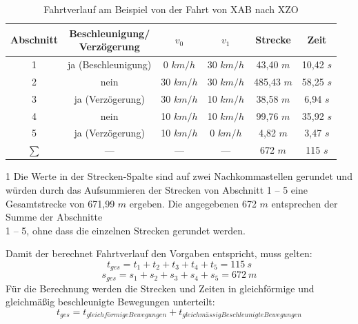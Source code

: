\begin{table}
\begin{center}
\begin{threeparttable}
\renewcommand{\arraystretch}{1.2}
\begin{tabular}{c|c|c|c|c|c}
Abschnitt & \makecell{Beschleunigung/\\Verzögerung}& $v_0$ & $v_1$ & Strecke & Zeit\\ \hline
1                   &   ja (Beschleunigung)   & 0 $km/h$ & 30 $km/h$        &         43,40 $m$    & 10,42 $s$   \\ \hline
2                  &       nein& 30 $km/h$ & 30 $km/h$       &    485,43 $m$ & 58,25 $s$   \\ \hline
3                   &       ja (Verzögerung)& 30 $km/h$ & 10 $km/h$           &   38,58 $m$    & 6,94 $s$  \\ \hline
4                   &      nein & 10 $km/h$ & 10 $km/h$       &   99,76 $m$    & 35,92 $s$   \\ \hline
5                   &       ja (Verzögerung)& 10 $km/h$ & 0 $km/h$          &    4,82 $m$  & 3,47 $s$ \\ \hline
$\sum$                   &       ---& --- & ---          &    672 $m$\tnote{1}  & 115 $s$ \\ 
\end{tabular}
\begin{tablenotes}\footnotesize
    \item[1] Die Werte in der Strecken-Spalte sind auf zwei Nachkommastellen gerundet und würden durch das Aufsummieren der Strecken von Abschnitt 1 -- 5 eine Gesamtstrecke von 671,99 $m$ ergeben. Die angegebenen 672 $m$ entsprechen der Summe der Abschnitte\\1 -- 5, ohne dass die einzelnen Strecken gerundet werden.
\end{tablenotes}
\renewcommand{\arraystretch}{1}
\caption{Fahrtverlauf am Beispiel von der Fahrt von XAB nach XZO}
\label{table:beispielebuef}
\end{threeparttable}
\end{center}
\end{table}
\noindent Damit der berechnet Fahrtverlauf den Vorgaben entspricht, muss gelten:
\[t_{ges} = t_1 + t_2 + t_3 + t_4 + t_5 = 115\:s\]
\[s_{ges} = s_1 + s_2 + s_3 + s_4 + s_5 = 672\:m\]
Für die Berechnung werden die Strecken und Zeiten in gleichförmige und gleichmäßig beschleunigte Bewegungen unterteilt:
\[t_{ges} = t_{gleichförmige Bewegungen} + t_{gleichmässig Beschleunigte Bewegungen}\]
